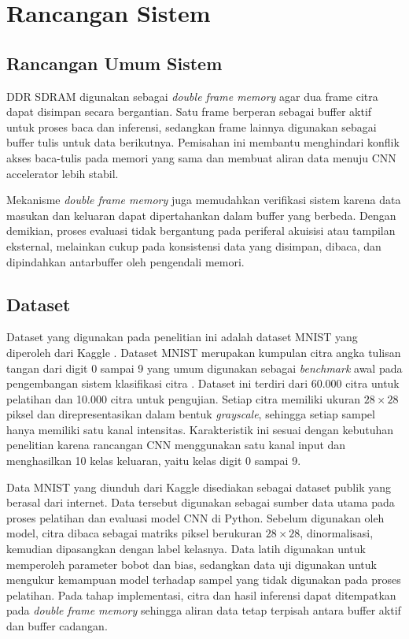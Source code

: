 \section{Rancangan Sistem}
    \subsection{Rancangan Umum Sistem}
	DDR SDRAM digunakan sebagai \emph{double frame memory} agar dua frame citra
	dapat disimpan secara bergantian. Satu frame berperan sebagai buffer aktif
	untuk proses baca dan inferensi, sedangkan frame lainnya digunakan sebagai
	buffer tulis untuk data berikutnya. Pemisahan ini membantu menghindari
	konflik akses baca-tulis pada memori yang sama dan membuat aliran data
	menuju CNN accelerator lebih stabil.

		Mekanisme \emph{double frame memory} juga memudahkan verifikasi sistem
	karena data masukan dan keluaran dapat dipertahankan dalam buffer yang
	berbeda. Dengan demikian, proses evaluasi tidak bergantung pada periferal
	akuisisi atau tampilan eksternal, melainkan cukup pada konsistensi data yang
	disimpan, dibaca, dan dipindahkan antarbuffer oleh pengendali memori.

	\subsection{Dataset}
		Dataset yang digunakan pada penelitian ini adalah dataset MNIST yang diperoleh
		dari Kaggle \cite{KaggleMNISTDataset}. Dataset MNIST merupakan kumpulan citra
		angka tulisan tangan dari digit 0 sampai 9 yang umum digunakan sebagai
		\emph{benchmark} awal pada pengembangan sistem klasifikasi citra
		\cite{Lecun1998GradientBasedLearning}. Dataset ini terdiri dari 60.000 citra
		untuk pelatihan dan 10.000 citra untuk pengujian. Setiap citra memiliki
		ukuran $28 \times 28$ piksel dan direpresentasikan dalam bentuk
		\emph{grayscale}, sehingga setiap sampel hanya memiliki satu kanal intensitas.
		Karakteristik ini sesuai dengan kebutuhan penelitian karena rancangan CNN
		menggunakan satu kanal input dan menghasilkan 10 kelas keluaran, yaitu
		kelas digit 0 sampai 9.

		Data MNIST yang diunduh dari Kaggle disediakan sebagai dataset publik yang
		berasal dari internet. Data tersebut digunakan sebagai sumber data utama pada
		proses pelatihan dan evaluasi model CNN di Python. Sebelum digunakan oleh
		model, citra dibaca sebagai matriks piksel berukuran $28 \times 28$,
		dinormalisasi, kemudian dipasangkan dengan label kelasnya. Data latih
		digunakan untuk memperoleh parameter bobot dan bias, sedangkan data uji
		digunakan untuk mengukur kemampuan model terhadap sampel yang tidak
		digunakan pada proses pelatihan. Pada tahap implementasi, citra dan hasil
		inferensi dapat ditempatkan pada \emph{double frame memory} sehingga aliran
		data tetap terpisah antara buffer aktif dan buffer cadangan.

